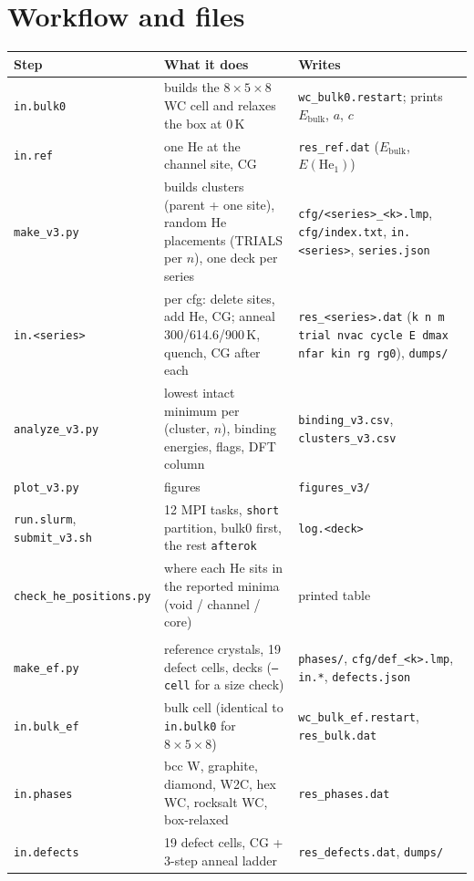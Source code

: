 \documentclass[10pt]{article}
\newcommand{\cmd}[1]{\texttt{\small #1}}
\newcommand{\He}{\mathrm{He}}
\newcommand{\sect}[1]{\Needspace{12\baselineskip}\section{#1}}
\begin{document}
\sect{Workflow and files}
\begin{xltabular}{\linewidth}{L{2.8cm} Y L{6.2cm}}
\toprule
\textbf{Step} & \textbf{What it does} & \textbf{Writes} \\
\midrule\endhead
\cmd{in.bulk0} & builds the $8\times5\times8$ WC cell and relaxes the box at 0\,K & \cmd{wc\_bulk0.restart}; prints $E_\mathrm{bulk}$, $a$, $c$ \\
\cmd{in.ref} & one He at the channel site, CG & \cmd{res\_ref.dat} ($E_\mathrm{bulk}$, $E(\He_1)$) \\
\cmd{make\_v3.py} & builds clusters (parent + one site), random He placements (TRIALS per $n$), one deck per series & \cmd{cfg/<series>\_<k>.lmp}, \cmd{cfg/index.txt}, \cmd{in.<series>}, \cmd{series.json} \\
\cmd{in.<series>} & per cfg: delete sites, add He, CG; anneal 300/614.6/900\,K, quench, CG after each & \cmd{res\_<series>.dat} (\cmd{k n m trial nvac cycle E dmax nfar kin rg rg0}), \cmd{dumps/} \\
\cmd{analyze\_v3.py} & lowest intact minimum per (cluster, $n$), binding energies, flags, DFT column & \cmd{binding\_v3.csv}, \cmd{clusters\_v3.csv} \\
\cmd{plot\_v3.py} & figures & \cmd{figures\_v3/} \\
\cmd{run.slurm}, \cmd{submit\_v3.sh} & 12 MPI tasks, \cmd{short} partition, bulk0 first, the rest \cmd{afterok} & \cmd{log.<deck>} \\
\cmd{check\_he\_positions.py} & where each He sits in the reported minima (void / channel / core) & printed table \\
 \\
\cmd{make\_ef.py} & reference crystals, 19 defect cells, decks (\cmd{--cell} for a size check) & \cmd{phases/}, \cmd{cfg/def\_<k>.lmp}, \cmd{in.*}, \cmd{defects.json} \\
\cmd{in.bulk\_ef} & bulk cell (identical to \cmd{in.bulk0} for $8\times5\times8$) & \cmd{wc\_bulk\_ef.restart}, \cmd{res\_bulk.dat} \\
\cmd{in.phases} & bcc W, graphite, diamond, W2C, hex WC, rocksalt WC, box-relaxed & \cmd{res\_phases.dat} \\
\cmd{in.defects} & 19 defect cells, CG + 3-step anneal ladder & \cmd{res\_defects.dat}, \cmd{dumps/} \\

\end{xltabular}
\end{document}

